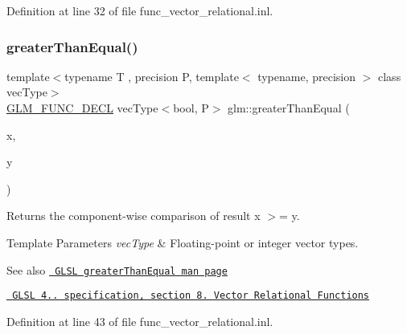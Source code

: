 Definition at line 32 of file func\+\_\+vector\+\_\+relational.\+inl.

\mbox{\label{group__core__func__vector__relational_gaee7e101f8cc4ea43924f14dcdeb2ef26}} 
\subsubsection{\texorpdfstring{greaterThanEqual()}{greaterThanEqual()}}
{\footnotesize\ttfamily template$<$typename T , precision P, template$<$ typename, precision $>$ class vec\+Type$>$ \\
\mbox{\hyperlink{setup_8hpp_ab2d052de21a70539923e9bcbf6e83a51}{G\+L\+M\+\_\+\+F\+U\+N\+C\+\_\+\+D\+E\+CL}} vec\+Type$<$bool, P$>$ glm\+::greater\+Than\+Equal (\begin{DoxyParamCaption}\item[{vec\+Type$<$ T, P $>$ const \&}]{x,  }\item[{vec\+Type$<$ T, P $>$ const \&}]{y }\end{DoxyParamCaption})}

Returns the component-\/wise comparison of result x $>$= y.


\begin{DoxyTemplParams}{Template Parameters}
{\em vec\+Type} & Floating-\/point or integer vector types.\\
\hline
\end{DoxyTemplParams}
\begin{DoxySeeAlso}{See also}
\href{http://www.opengl.org/sdk/docs/manglsl/xhtml/greaterThanEqual.xml}{\texttt{ G\+L\+SL greater\+Than\+Equal man page}} 

\href{http://www.opengl.org/registry/doc/GLSLangSpec.4.20.8.pdf}{\texttt{ G\+L\+SL 4.. specification, section 8. Vector Relational Functions}} 
\end{DoxySeeAlso}


Definition at line 43 of file func\+\_\+vector\+\_\+relational.\+inl.

\mbox{\label{group__core__func__vector__relational_ga6261970937a70b0b747ae0d3ade1c188}} 
